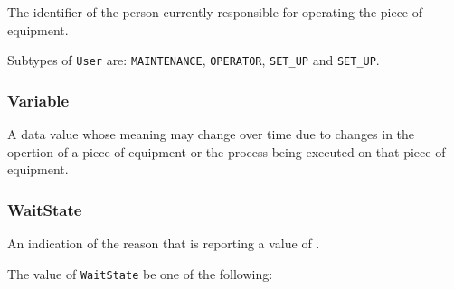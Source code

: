 The identifier of the person currently responsible for operating the piece of equipment.


Subtypes of \texttt{User} are: \texttt{MAINTENANCE}, \texttt{OPERATOR}, \texttt{SET_UP} and \texttt{SET_UP}. 
\FloatBarrier

\subsubsection{Variable}
  \label{sec:Variable}



A data value whose meaning may change over time due to changes in the opertion of a piece of equipment or the process being executed on that piece of equipment.

\FloatBarrier

\subsubsection{WaitState}
  \label{sec:WaitState}



An indication of the reason that  is reporting a value of .


The value of \texttt{WaitState} \MUST be one of the following: 

